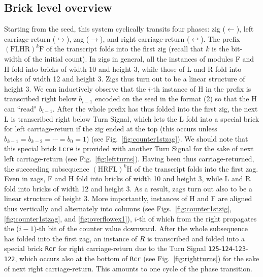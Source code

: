 \documentclass[twocolumn]{svjour3}
\begin{document}
\subsection{Brick level overview}
Starting from the seed, this system cyclically transits four phases: zig ($\leftarrow$), left carriage-return ($\hookrightarrow$), zag ($\rightarrow$), and right carriage-return ($\hookleftarrow$). 
The prefix $(\mathrm{FLHR})^k \mathrm{F}$ of the transcript folds into the first zig (recall that $k$ is the bit-width of the initial count). 
In zigs in general, all the instances of modules F and H fold into bricks of width 10 and height 3, while those of L and R fold into bricks of width 12 and height 3. 
Zigs thus turn out to be a linear structure of height 3. 
We can inductively observe that the $i$-th instance of H in the prefix is transcribed right below $b_{i-1}$ encoded on the seed in the format (2) so that the H can ``read" $b_{i-1}$. 
After the whole prefix has thus folded into the first zig, the next L is transcribed right below Turn Signal, which lets the L fold into a special brick for left carriage-return if the zig ended at the top (this occurs unless $b_{k-1} = b_{k-2} = \cdots = b_0 = 1$) (see Fig.~\ref{fig:counter1stzag}). 
We should note that this special brick \texttt{Lcre} is provided with another Turn Signal for the sake of next left carriage-return (see Fig.~\ref{fig:leftturns}).
Having been thus carriage-returned, the succeeding subsequence $(\mathrm{HRFL})^k \mathrm{H}$ of the transcript folds into the first zag.
Even in zags, F and H fold into bricks of width 10 and height 3, while L and R fold into bricks of width 12 and height 3. 
As a result, zags turn out also to be a linear structure of height 3. 
More importantly, instances of H and F are aligned thus vertically and alternately into columns (see Figs.~\ref{fig:counter1stzig}, \ref{fig:counter1stzag}, and \ref{fig:overflowex1}), $i$-th of which from the right propagates the ($i{-}1$)-th bit of the counter value downward. 
After the whole subsequence has folded into the first zag, an instance of $R$ is transcribed and folded into a special brick \texttt{Rcr} for right carriage-return due to the Turn Signal \texttt{125}-\texttt{124}-\texttt{123}-\texttt{122}, which occurs also at the bottom of \texttt{Rcr} (see Fig.~\ref{fig:rightturns}) for the sake of next right carriage-return. 
This amounts to one cycle of the phase transition.
 
\end{document}
